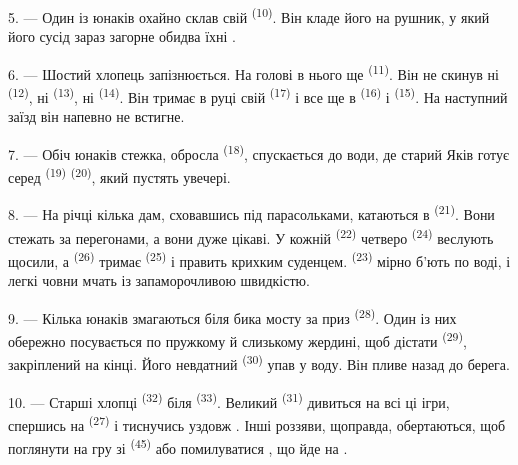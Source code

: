 5. --- Один із юнаків охайно склав свій  \textsuperscript{(10)}.
Він кладе його на рушник, у який його сусід зараз загорне обидва їхні
.

6. --- Шостий хлопець запізнюється. На голові в нього ще 
\textsuperscript{(11)}. Він не скинув ні  \textsuperscript{(12)},
ні  \textsuperscript{(13)}, ні 
\textsuperscript{(14)}. Він тримає в руці свій 
\textsuperscript{(17)} і все ще в  \textsuperscript{(16)} і
 \textsuperscript{(15)}. На наступний заїзд він напевно не
встигне.

7. --- Обіч юнаків стежка, обросла  \textsuperscript{(18)},
спускається до води, де старий Яків готує серед 
\textsuperscript{(19)}  \textsuperscript{(20)}, який пустять
увечері.

\VUsaut{4.4mm}
\VUsaut{3.4mm}

8. --- На річці кілька дам, сховавшись під парасольками, катаються в
 \textsuperscript{(21)}. Вони стежать за перегонами, а вони дуже
цікаві. У кожній  \textsuperscript{(22)} четверо 
\textsuperscript{(24)} веслують щосили, а 
\textsuperscript{(26)} тримає  \textsuperscript{(25)} і править
крихким суденцем.  \textsuperscript{(23)} мірно б'ють по воді, і
легкі човни мчать із запаморочливою швидкістю.

9. --- Кілька юнаків змагаються біля бика мосту за приз 
\textsuperscript{(28)}. Один із них обережно посувається по пружкому й слизькому
жердині, щоб дістати  \textsuperscript{(29)}, закріплений на
кінці. Його невдатний  \textsuperscript{(30)} упав у воду. Він
пливе назад до берега.

10. --- Старші хлопці  \textsuperscript{(32)} біля
 \textsuperscript{(33)}. Великий 
\textsuperscript{(31)} дивиться на всі ці ігри, спершись на 
 \textsuperscript{(27)} і тиснучись уздовж . Інші
роззяви, щоправда, обертаються, щоб поглянути на гру зі 
\textsuperscript{(45)} або помилуватися , що йде на
.

